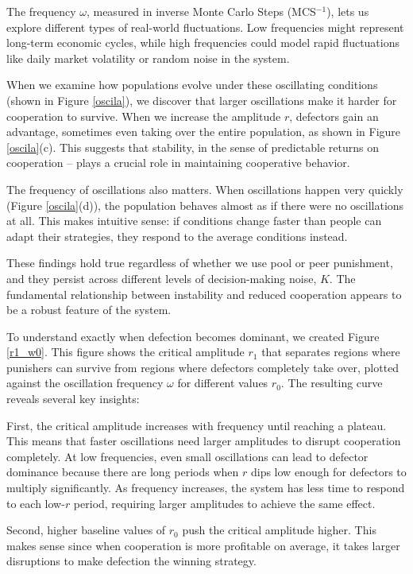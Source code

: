 The frequency $\omega$, measured in inverse Monte Carlo Steps (MCS$^{-1}$), lets us explore different types of real-world fluctuations. Low frequencies might represent long-term economic cycles, while high frequencies could model rapid fluctuations like daily market volatility or random noise in the system.

When we examine how populations evolve under these oscillating conditions (shown in Figure \ref{oscila}), we discover that larger oscillations make it harder for cooperation to survive. When we increase the amplitude $r$, defectors gain an advantage, sometimes even taking over the entire population, as shown in Figure \ref{oscila}(c). This suggests that stability, in the sense of predictable returns on cooperation – plays a crucial role in maintaining cooperative behavior.

The frequency of oscillations also matters. When oscillations happen very quickly (Figure \ref{oscila}(d)), the population behaves almost as if there were no oscillations at all. This makes intuitive sense: if conditions change faster than people can adapt their strategies, they respond to the average conditions instead.

These findings hold true regardless of whether we use pool or peer punishment, and they persist across different levels of decision-making noise, $K$. The fundamental relationship between instability and reduced cooperation appears to be a robust feature of the system.

To understand exactly when defection becomes dominant, we created Figure \ref{r1_w0}. This figure shows the critical amplitude $r_1$ that separates regions where punishers can survive from regions where defectors completely take over, plotted against the oscillation frequency $\omega$ for different values $r_0$. The resulting curve reveals several key insights:

First, the critical amplitude increases with frequency until reaching a plateau. This means that faster oscillations need larger amplitudes to disrupt cooperation completely. At low frequencies, even small oscillations can lead to defector dominance because there are long periods when $r$ dips low enough for defectors to multiply significantly. As frequency increases, the system has less time to respond to each low-$r$ period, requiring larger amplitudes to achieve the same effect.

Second, higher baseline values of $r_0$ push the critical amplitude higher. This makes sense since when cooperation is more profitable on average, it takes larger disruptions to make defection the winning strategy.


